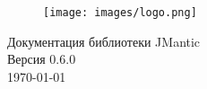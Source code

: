 \begin{titlepage}

\begin{figure}
    \centering
    \texttt{[image: images/logo.png]}
\end{figure}

\begin{center}
    \huge Документация библиотеки JMantic \\[0.5em]
    \large Версия 0.6.0 \\[0.5em]
    
    \vfill
    \today
\end{center}

\end{titlepage}